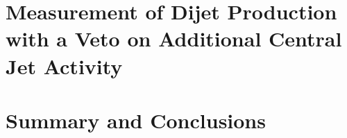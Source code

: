 \documentclass[12pt,PhD]{Thesis}
\begin{document}
\chapter{Measurement of Dijet Production with a Veto on Additional Central Jet Activity}
\label{chp:GBJ1}


 







%
%
%
%        
%
%
%


%
%
% 
%
%
%
%
%
%
%
%
%

\chapter{Summary and Conclusions}
\label{chp:Conc}



%

\end{document}
